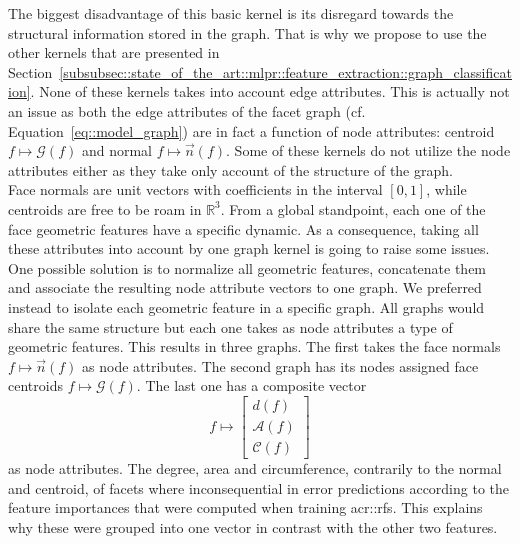         The biggest disadvantage of this basic kernel is its disregard towards the structural information stored in the graph.
        That is why we propose to use the other kernels that are presented in Section~\ref{subsubsec::state_of_the_art::mlpr::feature_extraction::graph_classification}.
        None of these kernels takes into account edge attributes.
        This is actually not an issue as both the edge attributes of the facet graph (cf. Equation~\ref{eq::model_graph}) are in fact a function of node attributes: centroid \(f \mapsto \mathscr{G}\left(f\right)\) and normal \(f \mapsto \vec{n}\left(f\right)\).
        Some of these kernels do not utilize the node attributes either as they take only account of the structure of the graph.\\

        Face normals are unit vectors with coefficients in the interval \([0, 1]\), while centroids are free to be roam in \(\mathbb{R}^3\).
        From a global standpoint, each one of the face geometric features have a specific dynamic.
        As a consequence, taking all these attributes into account by one graph kernel is going to raise some issues.
        One possible solution is to normalize all geometric features, concatenate them and associate the resulting node attribute vectors to one graph.
        We preferred instead to isolate each geometric feature in a specific graph.
        All graphs would share the same structure but each one takes as node attributes a type of geometric features.
        This results in three graphs.
        The first takes the face normals \(f \mapsto \vec{n}\left(f\right)\) as node attributes.
        The second graph has its nodes assigned face centroids \(f \mapsto \mathscr{G}\left(f\right)\).
        The last one has a composite vector
        \begin{equation*}
            f \mapsto \begin{bmatrix}
                d\left(f\right)\\
                \mathscr{A}\left(f\right)\\
                \mathscr{C}\left(f\right)            
            \end{bmatrix}
        \end{equation*} as node attributes.
        The degree, area and circumference, contrarily to the normal and centroid, of facets where inconsequential in error predictions according to the feature importances that were computed when training \glspl{acr::rf}.
        This explains why these were grouped into one vector in contrast with the other two features.\\

